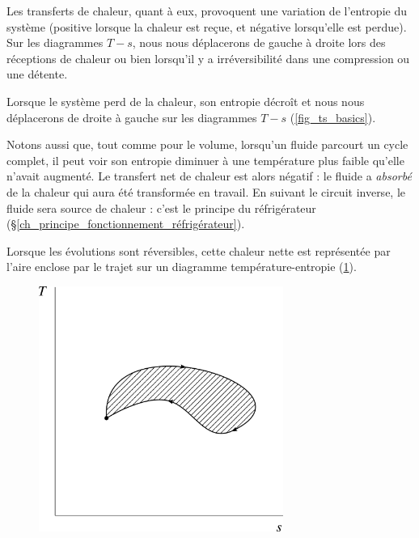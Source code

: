 		Les transferts de chaleur, quant à eux, provoquent une variation de l’entropie du système (positive lorsque la chaleur est reçue, et négative lorsqu’elle est perdue). Sur les diagrammes $T-s$, nous nous déplacerons de gauche à droite lors des réceptions de chaleur ou bien lorsqu’il y a irréversibilité dans une compression ou une détente.

		Lorsque le système perd de la chaleur, son entropie décroît et nous nous déplacerons de droite à gauche sur les diagrammes $T-s$ (\cref{fig_ts_basics}).

		\clearfloats
		Notons aussi que, tout comme pour le volume, lorsqu’un fluide parcourt un cycle complet, il peut voir son entropie diminuer à une température plus faible qu’elle n’avait augmenté. Le transfert net de chaleur est alors négatif : le fluide a \emph{absorbé} de la chaleur qui aura été transformée en travail. En suivant le circuit inverse, le fluide sera source de chaleur : c’est le principe du réfrigérateur (\S\ref{ch_principe_fonctionnement_réfrigérateur}).

		Lorsque les évolutions sont réversibles, cette chaleur nette est représentée par l’aire enclose par le trajet sur un diagramme température-entropie (\cref{fig_ts_cycle}).

		\begin{figure}
			\begin{center}
				\includegraphics[width=8cm]{images/ts_cycle.png}
			\end{center}
			\label{fig_ts_cycle}
		\end{figure}

